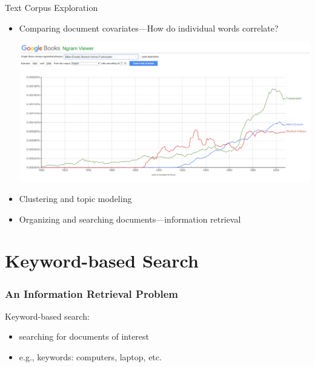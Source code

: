 \documentclass[compress,mathserif,t]{beamer} %
\begin{document}
\begin{frame}{Text Corpus Exploration}
	
\begin{itemize}
	\item Comparing document covariates---How 
	do individual words correlate?
	
\includegraphics[width=.98\textwidth]{word-covariate-analysis}

	\item Clustering and topic modeling 
	\item Organizing and searching 
	documents---information retrieval   
\end{itemize}

\end{frame}





\section{Keyword-based Search}

\begin{frame}
	\frametitle{An Information Retrieval 
		Problem }
	
	Keyword-based search: \\[.3cm]   
		\begin{itemize}
			\item searching for documents of 
			interest 
			\item e.g., keywords: computers, 
			laptop, etc.  
		\end{itemize}
	
	
\end{frame}
\end{document}
